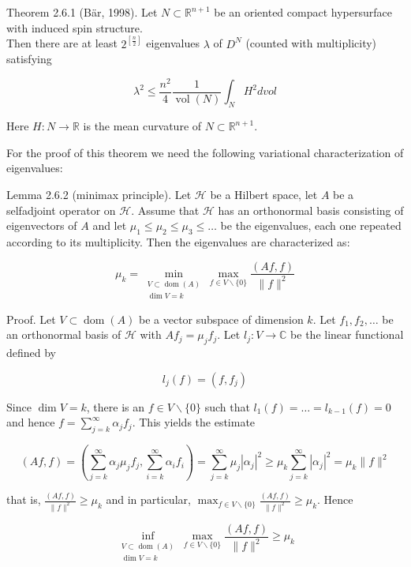\documentclass[10pt, letterpaper]{article}
\begin{document}
Theorem 2.6.1 (Bär, 1998). Let $N \subset \mathbb{R}^{n+1}$ be an oriented compact hypersurface with induced spin structure.\\
Then there are at least $2^{\left[\frac{n}{2}\right]}$ eigenvalues $\lambda$ of $D^{N}$ (counted with multiplicity) satisfying

$$
\lambda^{2} \leq \frac{n^{2}}{4} \frac{1}{\operatorname{vol}(N)} \int_{N} H^{2} d v o l
$$

Here $H: N \rightarrow \mathbb{R}$ is the mean curvature of $N \subset \mathbb{R}^{n+1}$.

For the proof of this theorem we need the following variational characterization of eigenvalues:

Lemma 2.6.2 (minimax principle). Let $\mathscr{H}$ be a Hilbert space, let $A$ be a selfadjoint operator on $\mathscr{H}$. Assume that $\mathscr{H}$ has an orthonormal basis consisting of eigenvectors of $A$ and let $\mu_{1} \leq \mu_{2} \leq \mu_{3} \leq \ldots$ be the eigenvalues, each one repeated according to its multiplicity. Then the eigenvalues are characterized as:

$$
\mu_{k}=\min _{\substack{V \subset \operatorname{dom}(A) \\ \operatorname{dim} V=k}} \max _{f \in V \backslash\{0\}} \frac{(A f, f)}{\|f\|^{2}}
$$

Proof. Let $V \subset \operatorname{dom}(A)$ be a vector subspace of dimension $k$. Let $f_{1}, f_{2}, \ldots$ be an orthonormal basis of $\mathscr{H}$ with $A f_{j}=\mu_{j} f_{j}$. Let $l_{j}: V \rightarrow \mathbb{C}$ be the linear functional\\
defined by

$$
l_{j}(f)=\left(f, f_{j}\right)
$$

Since $\operatorname{dim} V=k$, there is an $f \in V \backslash\{0\}$ such that $l_{1}(f)=\ldots=l_{k-1}(f)=0$ and hence $f=\sum_{j=k}^{\infty} \alpha_{j} f_{j}$. This yields the estimate

$$
(A f, f)=\left(\sum_{j=k}^{\infty} \alpha_{j} \mu_{j} f_{j}, \sum_{i=k}^{\infty} \alpha_{i} f_{i}\right)=\sum_{j=k}^{\infty} \mu_{j}\left|\alpha_{j}\right|^{2} \geq \mu_{k} \sum_{j=k}^{\infty}\left|\alpha_{j}\right|^{2}=\mu_{k}\|f\|^{2}
$$

that is, $\frac{(A f, f)}{\|f\|^{2}} \geq \mu_{k}$ and in particular, $\max _{f \in V \backslash\{0\}} \frac{(A f, f)}{\|f\|^{2}} \geq \mu_{k}$. Hence

$$
\inf _{\substack{V \subset \operatorname{dom}(A) \\ \operatorname{dim} V=k}} \max _{f \in V \backslash\{0\}} \frac{(A f, f)}{\|f\|^{2}} \geq \mu_{k}
$$
\end{document}
